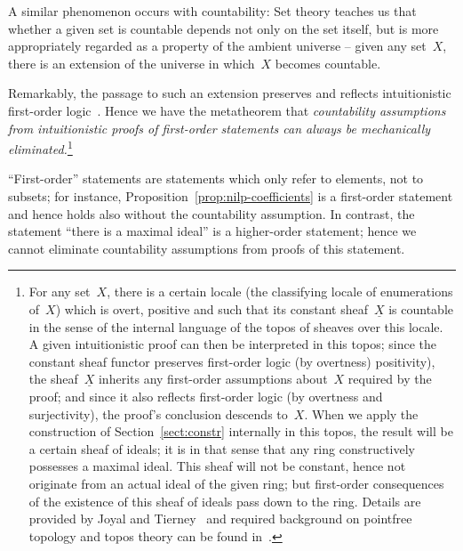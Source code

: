 \documentclass[oneside,reqno]{amsart}
\theoremstyle{definition}
\theoremstyle{plain}
\theoremstyle{remark}
\renewcommand{\_}{\mathpunct{.}\,}
\begin{document}
A similar phenomenon occurs with countability: Set theory teaches us that
whether a given set is countable depends not only on the set itself, but is
more appropriately regarded as a property of the ambient universe -- given any
set~$X$, there is an extension of the universe in which~$X$ becomes countable.

Remarkably, the passage to such an extension preserves and reflects
intuitionistic first-order logic~\cite[pp.~36f.]{joyal-tierney:grothendieck}.
Hence we have the metatheorem that \emph{countability assumptions from
intuitionistic proofs of first-order statements can always be mechanically
eliminated.}\footnote{For any set~$X$, there is a certain locale (the
classifying locale of enumerations of~$X$) which is overt, positive and such
that its constant sheaf~$\underline{X}$ is countable in the sense of the
internal language of the topos of sheaves over this locale. A given
intuitionistic proof can then be interpreted in this topos; since the constant
sheaf functor preserves first-order logic (by overtness) positivity), the
sheaf~$\underline{X}$ inherits any first-order assumptions about~$X$ required
by the proof; and since it also reflects first-order logic (by overtness and
surjectivity), the proof's conclusion descends to~$X$. When we apply the
construction of Section~\ref{sect:constr} internally in this topos, the result
will be a certain sheaf of ideals; it is in that sense that any ring
constructively possesses a maximal ideal. This sheaf will not be constant,
hence not originate from an actual ideal of the given ring; but first-order
consequences of the existence of this sheaf of ideals pass down to the ring.
Details are provided by Joyal and
Tierney~\cite[pp.~36f.]{joyal-tierney:grothendieck} and required background on
pointfree topology and topos theory can be found
in~\cite{blechschmidt:generalized-spaces,johnstone:art,johnstone:point,vickers:continuity,vickers:locales-toposes,belanger-marquis:pointless,johnstone:baby-elephant}.}

``First-order'' statements are statements which only refer to elements, not to
subsets; for instance, Proposition~\ref{prop:nilp-coefficients} is a
first-order statement and hence holds also without the countability assumption.
In contrast, the statement ``there is a maximal ideal'' is a higher-order
statement; hence we cannot eliminate countability assumptions from proofs of
this statement.
\end{document}
